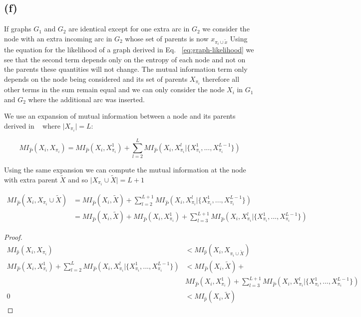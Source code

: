 \documentclass[11pt]{amsart}
\begin{document}
\subsection{(f)}

If graphs $G_1$ and $G_2$ are identical except for one extra arc in $G_2$ we consider the node with an extra incoming arc in $G_2$ whose set of parents is now $x_{\pi_i \cup \tilde{x}}$ Using the equation for the likelihood of a graph derived in Eq. ~\ref{eq:graph-likelihood} we see that the second term depends only on the entropy of each node and not on the parents these quantities will not change. The mutual information term only depends on the node being considered and its set of parents $X_{\pi_i}$ therefore all other terms in the sum remain equal and we can only consider the node $X_i$ in $G_1$ and $G_2$ where the additional arc was inserted.

We use an expansion of mutual information between a node and its parents derived in ~\cite{campos2006scoring} where $\vert X_{\pi_i} \vert = L$:

\begin{equation}
MI_{\hat{P}}(X_i, X_{\pi_i}) = MI_{\hat{P}}(X_i, X_{\pi_{i}}^{1}) + \sum_{l = 2}^{L} MI_{\hat{P}}(X_i, X_{\pi_i}^{l} \vert \{X_{\pi_i}^{1},..., X_{\pi_i}^{L-1}\})
\end{equation}

Using the same expansion we can compute the mutual information at the node with extra parent $\tilde{X}$ and so $\vert X_{\pi_i} \cup \tilde{X} \vert = L + 1$

\begin{equation}
\begin{aligned}
MI_{\hat{P}}(X_i, X_{\pi_i} \cup \tilde{X}) &= MI_{\hat{P}}(X_i, \tilde{X}) + \sum_{l = 2}^{L+1} MI_{\hat{P}}(X_i, X_{\pi_i}^{l} \vert \{X_{\pi_i}^{1},..., X_{\pi_i}^{L-1}\}) \\
								  &= MI_{\hat{P}}(X_i, \tilde{X}) + MI_{\hat{P}}(X_i, X_{\pi_{i}}^{1}) + \sum_{l = 3}^{L+1} MI_{\hat{P}}(X_i, X_{\pi_i}^{l} \vert \{X_{\pi_i}^{1},..., X_{\pi_i}^{L-1}\})
\end{aligned}
\end{equation}

\begin{proof}
\begin{equation}
\begin{aligned}
MI_{\hat{p}}(X_i, X_{\pi_i}) &<  MI_{\hat{p}}(X_i, X_{\pi_i \cup \tilde{X}}) \\
MI_{\hat{P}}(X_i, X_{\pi_{i}}^{1}) + \sum_{l = 2}^{L} MI_{\hat{P}}(X_i, X_{\pi_i}^{l} \vert \{X_{\pi_i}^{1},..., X_{\pi_i}^{L-1}\}) &< MI_{\hat{P}}(X_i, \tilde{X}) +\\ 
& MI_{\hat{P}}(X_i, X_{\pi_{i}}^{1}) + \sum_{l = 3}^{L+1} MI_{\hat{P}}(X_i, X_{\pi_i}^{l} \vert \{X_{\pi_i}^{1},..., X_{\pi_i}^{L-1}\}) \\
0 &< MI_{\hat{p}}(X_i, \tilde{X})
\end{aligned}
\end{equation}


\end{proof}
\end{document}
